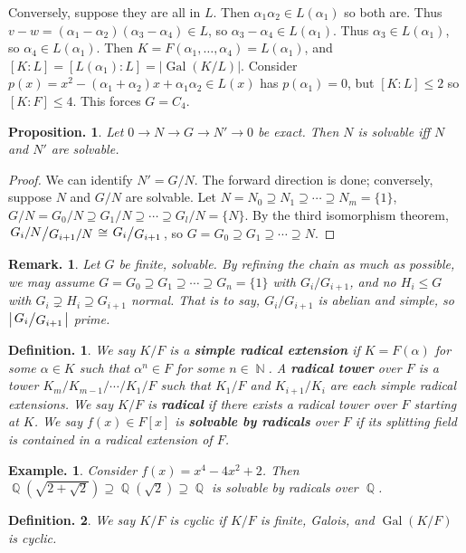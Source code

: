 \documentclass[11pt, a4paper]{memoir}
\DeclareMathOperator{\N}{{\mathbb{N}}}
\DeclareMathOperator{\Q}{{\mathbb{Q}}}
\newcommand{\mbf}[1]{{\boldmath\bfseries #1}}
\theoremstyle{change}
\newtheorem{proposition}[theorem]{Proposition.}
\theoremstyle{plain}
\theoremstyle{nonumberplain}
\newtheorem{definition}{Definition.}
\newtheorem{example}{Example.}
\newtheorem{remark}{Remark.}
\newtheorem{proof}{Proof}
\DeclareMathOperator{\Gal}{Gal}
\newcommand{\quot}[2]{\mathchoice{\left.\raisebox{0.14em}{$#1$}\middle/\raisebox{-0.14em}{$#2$}\right.}
                                 {\left.\raisebox{0.08em}{$#1$}\middle/\raisebox{-0.08em}{$#2$}\right.}
                                 {\left.\raisebox{0.03em}{$#1$}\middle/\raisebox{-0.03em}{$#2$}\right.}
                                 {\left.\raisebox{0em}{$#1$}\middle/\raisebox{0em}{$#2$}\right.}}
\numberwithin{equation}{section}
\begin{document}
Conversely, suppose they are all in $L$.
Then $\alpha_1\alpha_2\in L(\alpha_1)$ so both are.
Thus $v-w=(\alpha_1-\alpha_2)(\alpha_3-\alpha_4)\in L$, so $\alpha_3-\alpha_4\in L(\alpha_1)$.
Thus $\alpha_3\in L(\alpha_1)$, so $\alpha_4\in L(\alpha_1)$.
Then $K=F(\alpha_1,\ldots,\alpha_4)=L(\alpha_1)$, and $[K:L]=[L(\alpha_1):L]=|\Gal(K/L)|$.
Consider $p(x)=x^2-(\alpha_1+\alpha_2)x+\alpha_1\alpha_2\in L(x)$ has $p(\alpha_1)=0$, but $[K:L]\leq 2$ so $[K:F]\leq 4$.
This forces $G=C_4$.
\begin{proposition}
    Let $0\to N\to G\to N'\to 0$ be exact.
    Then $N$ is solvable iff $N$ and $N'$ are solvable.
\end{proposition}
\begin{proof}
    We can identify $N'=G/N$.
    The forward direction is done; conversely, suppose $N$ and $G/N$ are solvable.
    Let $N=N_0\supseteq N_1\supseteq\cdots\supseteq N_m=\{1\}$, $G/N=G_0/N\supseteq G_1/N\supseteq\cdots\supseteq G_l/N=\{N\}$.
    By the third isomorphism theorem, $\quot{G_i/N}{G_{i+1}/N}\cong \quot{G_i}{G_{i+1}}$, so $G=G_0\supseteq G_1\supseteq\cdots\supseteq N$.
\end{proof}
\begin{remark}
    Let $G$ be finite, solvable.
    By refining the chain as much as possible, we may assume $G=G_0\supseteq G_1\supseteq\cdots\supseteq G_n=\{1\}$ with $G_i/G_{i+1}$, and no $H_i\leq G$ with $G_i\supsetneq H_i\supseteq G_{i+1}$ normal.
    That is to say, $G_i/G_{i+1}$ is abelian and simple, so $\left\lvert\quot{G_i}{G_{i+1}}\right\rvert$ prime.
\end{remark}
\begin{definition}
    We say $K/F$ is a \mbf{simple radical extension} if $K=F(\alpha)$ for some $\alpha\in K$ such that $\alpha^n\in F$ for some $n\in\N$.
    A \mbf{radical tower} over $F$ is a tower $K_m/K_{m-1}/\cdots/K_1/F$ such that $K_1/F$ and $K_{i+1}/K_i$ are each simple radical extensions.
    We say $K/F$ is \mbf{radical} if there exists a radical tower over $F$ starting at $K$.
    We say $f(x)\in F[x]$ is \mbf{solvable by radicals} over $F$ if its splitting field is contained in a radical extension of $F$.
\end{definition}
\begin{example}
    Consider $f(x)=x^4-4x^2+2$.
    Then $\Q(\sqrt{2+\sqrt{2}})\supseteq\Q(\sqrt{2})\supseteq\Q$ is solvable by radicals over $\Q$.
\end{example}
\begin{definition}
    We say $K/F$ is cyclic if $K/F$ is finite, Galois, and $\Gal(K/F)$ is cyclic.
\end{definition}
\end{document}
